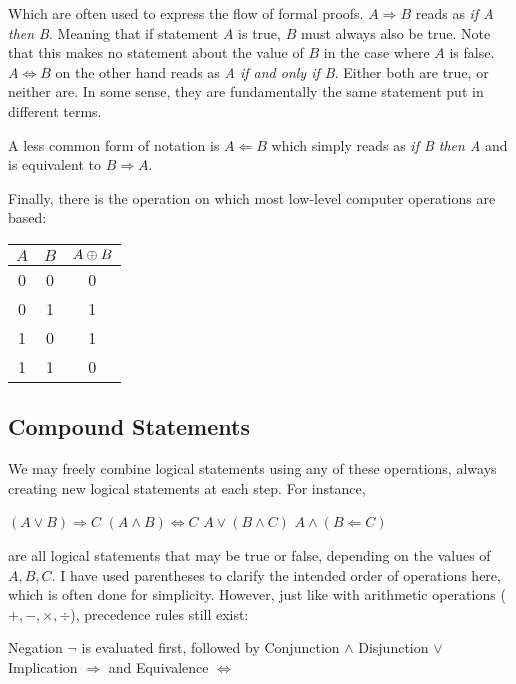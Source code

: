 {Which are often used to express the flow of formal proofs.
\(A \Rightarrow B\) reads as \emph{if A then B}. Meaning that if statement \(A\)
is true, \(B\) must always also be true. Note that this makes no statement
about the value of \(B\) in the case where \(A\) is false.
\(A \Leftrightarrow B\) on the other hand reads as \emph{A if and only if B}.
Either both are true, or neither are. In some sense, they are fundamentally the
same statement put in different terms.

A less common form of notation is \(A \Leftarrow B\) which simply reads as
\emph{if B then A} and is equivalent to \(B \Rightarrow A\).

Finally, there is the operation on which most low-level computer operations are
based:

\begin{tcolorbox}[colframe=gray!80, colback=white, boxrule=0.4pt, top=4pt, bottom=4pt]
  \begin{minipage}[t]{\textwidth}
    \centering
    \vspace{-10pt}
    \vspace{3pt}
    \begin{tabular}{cc|c}
      \(A\) & \(B\) & \(A \oplus B\)\\
      \hline
      0 & 0 & 0 \\
      0 & 1 & 1 \\
      1 & 0 & 1 \\
      1 & 1 & 0 \\
    \end{tabular}
  \end{minipage}
\end{tcolorbox}
}


\subsection{Compound Statements}
We may freely combine logical statements using any of these operations, always
creating new logical statements at each step. For instance,
\begin{example}
  \((A \lor B) \Rightarrow C\)
  \hfill
  \((A \land B) \Leftrightarrow C\)
  \hfill
  \(A \lor (B \land C)\)
  \hfill
  \(A \land (B \Leftarrow C)\)
\end{example}

are all logical statements that may be true or false, depending on the values of
\(A, B, C\).
I have used parentheses to clarify the intended order of operations here, which
is often done for simplicity. However, just like with arithmetic operations
(\(+, -, \times, \div\)), precedence rules still exist:
\begin{itemize}
  \ii{} Negation \(\neg\) is evaluated first, followed by
  \ii{} Conjunction \(\land\)
  \ii{} Disjunction \(\lor\)
  \ii{} Implication \(\Rightarrow\) and
  \ii{} Equivalence \(\Leftrightarrow\)
\end{itemize}

